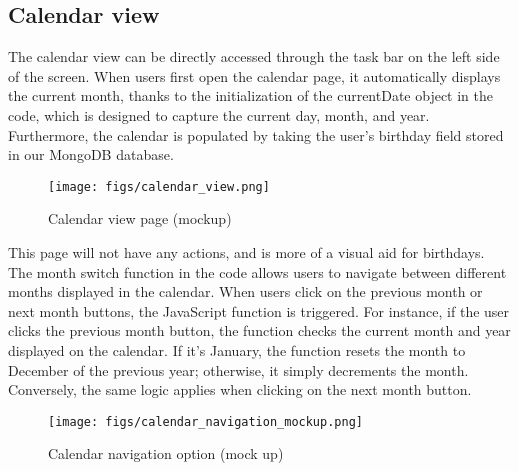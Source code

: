 \documentclass[conference]{IEEEtran}
\begin{document}
\subsection{Calendar view}
The calendar view can be directly accessed through the task bar on the left side of the screen. When users first open the calendar page, it automatically displays the current month, thanks to the initialization of the currentDate object in the code, which is designed to capture the current day, month, and year. Furthermore, the calendar is populated by taking the user’s birthday field stored in our MongoDB database.
\begin{figure}[H]
\centering
\texttt{[image: figs/calendar\_view.png]}
\caption{Calendar view page (mockup)}
\label{fig:Calendar view page (mockup)}
\end{figure}
This page will not have any actions, and is more of a visual aid for birthdays. The month switch function in the code allows users to navigate between different months displayed in the calendar. When users click on the previous month or next month buttons, the JavaScript function is triggered. For instance, if the user clicks the previous month button, the function checks the current month and year displayed on the calendar. If it's January, the function resets the month to December of the previous year; otherwise, it simply decrements the month. Conversely, the same logic applies when clicking on the next month button.
\begin{figure}[H]
\centering
\texttt{[image: figs/calendar\_navigation\_mockup.png]}
\caption{Calendar navigation option (mock up)}
\label{fig:Calendar navigation mockup}
\end{figure}
\end{document}
